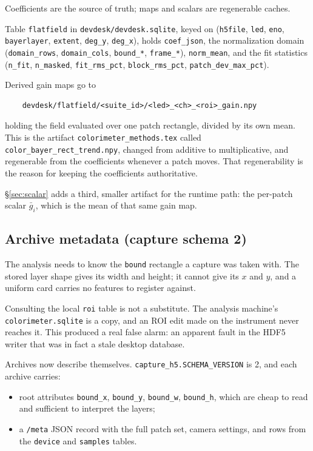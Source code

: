 \documentclass[11pt, a4paper]{article}
\newcommand{\code}[1]{\texttt{#1}}
\begin{document}
Coefficients are the source of truth;
maps and scalars are regenerable caches.

Table \code{flatfield} in \code{devdesk/devdesk.sqlite},
keyed on (\code{h5file}, \code{led}, \code{eno}, \code{bayerlayer},
\code{extent}, \code{deg\_y}, \code{deg\_x}),
holds \code{coef\_json},
the normalization domain
(\code{domain\_rows}, \code{domain\_cols}, \code{bound\_*}, \code{frame\_*}),
\code{norm\_mean},
and the fit statistics
(\code{n\_fit}, \code{n\_masked}, \code{fit\_rms\_pct},
\code{block\_rms\_pct}, \code{patch\_dev\_max\_pct}).

Derived gain maps go to

\begin{footnotesize}
\begin{verbatim}
    devdesk/flatfield/<suite_id>/<led>_<ch>_<roi>_gain.npy
\end{verbatim}
\end{footnotesize}

\noindent
holding the field evaluated over one patch rectangle,
divided by its own mean.
This is the artifact \code{colorimeter\_methods.tex} called
\code{color\_bayer\_rect\_trend.npy},
changed from additive to multiplicative,
and regenerable from the coefficients whenever a patch moves.
That regenerability is the reason for keeping the coefficients
authoritative.

\S\ref{sec:scalar} adds a third, smaller artifact for the runtime path:
the per-patch scalar $\bar{g}_i$,
which is the mean of that same gain map.

\subsection{Archive metadata (capture schema 2)}

The analysis needs to know the \code{bound} rectangle
a capture was taken with.
The stored layer shape gives its width and height;
it cannot give its $x$ and $y$,
and a uniform card carries no features to register against.

Consulting the local \code{roi} table is not a substitute.
The analysis machine's \code{colorimeter.sqlite} is a copy,
and an ROI edit made on the instrument never reaches it.
This produced a real false alarm:
an apparent fault in the HDF5 writer
that was in fact a stale desktop database.

Archives now describe themselves.
\code{capture\_h5.SCHEMA\_VERSION} is 2,
and each archive carries:

\begin{itemize}[nosep]
  \item root attributes \code{bound\_x}, \code{bound\_y},
        \code{bound\_w}, \code{bound\_h},
        which are cheap to read and sufficient to interpret the layers;
  \item a \code{/meta} JSON record with the full patch set,
        camera settings,
        and rows from the \code{device} and \code{samples} tables.
\end{itemize}
\end{document}
